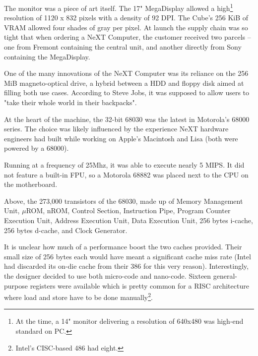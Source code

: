 The monitor was a piece of art itself. The 17" MegaDisplay allowed a high\footnote{At the time, a 14" monitor delivering a resolution of 640x480 was high-end standard on PC.} resolution of 1120 x 832 pixels with a density of 92 DPI. The Cube's 256 KiB of VRAM allowed four shades of gray per pixel. At launch the supply chain was so tight that when ordering a NeXT Computer, the customer received two parcels -- one from Fremont containing the central unit, and another directly from Sony containing the MegaDisplay.





\begin{figure}[H]
\centering
{}
\end{figure}
\par
One of the many innovations of the NeXT Computer was its reliance on the 256 MiB magneto-optical drive, a hybrid between a HDD and floppy disk aimed at filling both use cases. According to Steve Jobs, it was supposed to allow users to "take their whole world in their backpacks".\\
\par
At the heart of the machine, the 32-bit 68030 was the latest in Motorola's 68000 series. The choice was likely influenced by the experience NeXT hardware engineers had built while working on Apple's Macintosh and Lisa (both were powered by a 68000).\\
\par
 Running at a frequency of 25Mhz, it was able to execute nearly 5 MIPS. It did not feature a built-in FPU, so a Motorola 68882 was placed next to the CPU on the motherboard. %



\begin{figure}[H]
\centering
{}
\end{figure}
\par
\vspace{-3mm}
Above, the 273,000 transistors of the 68030, made up of  Memory Management Unit,  $\mu$ROM,  nROM,  Control Section,  Instruction Pipe,  Program Counter Execution Unit,  Address Execution Unit,  Data Execution Unit,  256 bytes i-cache,  256 bytes d-cache, and  Clock Generator.\\         
\par
It is unclear how much of a performance boost the two caches provided. Their small size of 256 bytes each would have meant a significant cache miss rate (Intel had discarded its on-die cache from their 386 for this very reason). Interestingly, the designer decided to use both micro-code and nano-code. Sixteen general-purpose registers were available which is pretty common for a RISC architecture where load and store have to be done manually\footnote{Intel's CISC-based 486 had eight.}.

